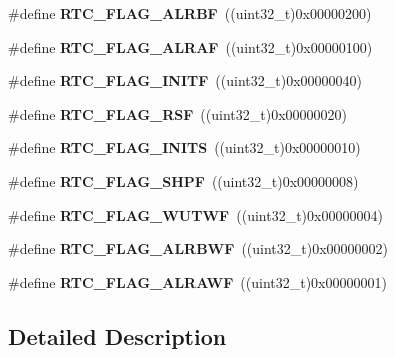 \begin{DoxyCompactItemize}
\item 
\#define {\bfseries R\+T\+C\+\_\+\+F\+L\+A\+G\+\_\+\+A\+L\+R\+BF}~((uint32\+\_\+t)0x00000200)\hypertarget{group___r_t_c___flags___definitions_gabb7bd65e83b346f42e28091ef1e643f5}{}\label{group___r_t_c___flags___definitions_gabb7bd65e83b346f42e28091ef1e643f5}

\item 
\#define {\bfseries R\+T\+C\+\_\+\+F\+L\+A\+G\+\_\+\+A\+L\+R\+AF}~((uint32\+\_\+t)0x00000100)\hypertarget{group___r_t_c___flags___definitions_gaf9e1a4b5eedd674d7b35ae334877ba12}{}\label{group___r_t_c___flags___definitions_gaf9e1a4b5eedd674d7b35ae334877ba12}

\item 
\#define {\bfseries R\+T\+C\+\_\+\+F\+L\+A\+G\+\_\+\+I\+N\+I\+TF}~((uint32\+\_\+t)0x00000040)\hypertarget{group___r_t_c___flags___definitions_ga8d973d7f6b07e80743e05d6822ff2147}{}\label{group___r_t_c___flags___definitions_ga8d973d7f6b07e80743e05d6822ff2147}

\item 
\#define {\bfseries R\+T\+C\+\_\+\+F\+L\+A\+G\+\_\+\+R\+SF}~((uint32\+\_\+t)0x00000020)\hypertarget{group___r_t_c___flags___definitions_ga78c4245996bef8d5f39226b6e37ed9c0}{}\label{group___r_t_c___flags___definitions_ga78c4245996bef8d5f39226b6e37ed9c0}

\item 
\#define {\bfseries R\+T\+C\+\_\+\+F\+L\+A\+G\+\_\+\+I\+N\+I\+TS}~((uint32\+\_\+t)0x00000010)\hypertarget{group___r_t_c___flags___definitions_gae6a2d26d4b10670f6506b14971f52fd2}{}\label{group___r_t_c___flags___definitions_gae6a2d26d4b10670f6506b14971f52fd2}

\item 
\#define {\bfseries R\+T\+C\+\_\+\+F\+L\+A\+G\+\_\+\+S\+H\+PF}~((uint32\+\_\+t)0x00000008)\hypertarget{group___r_t_c___flags___definitions_ga8fd11878d6285ab5d35966d598d5e6f9}{}\label{group___r_t_c___flags___definitions_ga8fd11878d6285ab5d35966d598d5e6f9}

\item 
\#define {\bfseries R\+T\+C\+\_\+\+F\+L\+A\+G\+\_\+\+W\+U\+T\+WF}~((uint32\+\_\+t)0x00000004)\hypertarget{group___r_t_c___flags___definitions_ga24648116b32442d30da74c497e2e88ae}{}\label{group___r_t_c___flags___definitions_ga24648116b32442d30da74c497e2e88ae}

\item 
\#define {\bfseries R\+T\+C\+\_\+\+F\+L\+A\+G\+\_\+\+A\+L\+R\+B\+WF}~((uint32\+\_\+t)0x00000002)\hypertarget{group___r_t_c___flags___definitions_gae9dd4b5b8059937c3422bc1e3eae3ced}{}\label{group___r_t_c___flags___definitions_gae9dd4b5b8059937c3422bc1e3eae3ced}

\item 
\#define {\bfseries R\+T\+C\+\_\+\+F\+L\+A\+G\+\_\+\+A\+L\+R\+A\+WF}~((uint32\+\_\+t)0x00000001)\hypertarget{group___r_t_c___flags___definitions_gaf4913efa96d03ded991b1cdddd6b7823}{}\label{group___r_t_c___flags___definitions_gaf4913efa96d03ded991b1cdddd6b7823}

\end{DoxyCompactItemize}


\subsection{Detailed Description}

